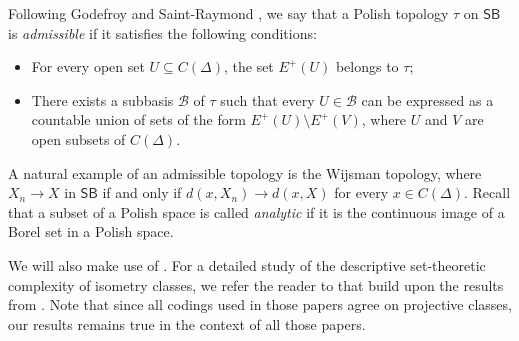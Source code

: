 \documentclass[12pt,fleqn]{amsart}
\theoremstyle{definition}
\theoremstyle{remark}
\begin{document}
Following Godefroy and Saint-Raymond \cite{GoSR}, we say that a Polish topology $\tau$ on $\mathsf{SB}$ is \emph{admissible} if it satisfies the following conditions:
\begin{itemize}
    \item For every open set $U \subseteq C(\Delta)$, the set $E^+(U)$ belongs to $\tau$;
    \item There exists a subbasis $\mathcal{B}$ of $\tau$ such that every $U \in \mathcal{B}$ can be expressed as a countable union of sets of the form $E^+(U) \setminus E^+(V)$, where $U$ and $V$ are open subsets of $C(\Delta)$.
\end{itemize}
A natural example of an admissible topology is the Wijsman topology, where $X_n \to X$ in $\mathsf{SB}$ if and only if $d(x, X_n) \to d(x, X)$ for every $x \in C(\Delta)$. Recall that a subset of a Polish space is called \emph{analytic} if it is the continuous image of a Borel set in a Polish space.

We will also make use of \cite[Theorem 4.1]{GoSR}. For a detailed study of the descriptive set-theoretic complexity of isometry classes, we refer the reader to \cite{Cuth1, Cuth2} that build upon the results from \cite{GoSR}. Note that since all codings used in those papers agree on projective classes, our results remains true in the context of all those papers.
\end{document}
